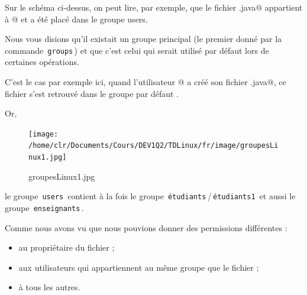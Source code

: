 \documentclass[11pt,a4paper]{article}
\begin{document}
          Sur le sch\'ema ci-dessus, on peut lire, par exemple, que le fichier \verb@Max.java@ 
          appartient \`a @ et a \'et\'e plac\'e dans le groupe users.
        
            \par
        
          Nous vous disions qu'il existait un groupe principal (le premier donn\'e par la commande \,\verb|groups|\,)
          et que c'est celui qui serait utilis\'e par d\'efaut lors de certaines op\'erations.
        
            \par
        
          C'est le cas par exemple ici,
          quand l'utilisateur @ a cr\'e\'e son fichier \verb@Max.java@,
          ce fichier s'est retrouv\'e dans le groupe par d\'efaut \verb@users@.
        
            \par
        
          Or, 
        
            \par
        \begin{figure}[hbt]
				    \begin{center}
					\texttt{[image: /home/clr/Documents/Cours/DEV1Q2/TDLinux/fr/image/groupesLinux1.jpg]}
						\end{center}
                
                    \caption[groupesLinux1.jpg]{groupesLinux1.jpg}
                \end{figure}
                    
            \par
        
          le groupe \,\verb|users|\, contient \`a la fois 
          le groupe \,\verb|étudiants|\,/\,\verb|étudiants1|\, et
          aussi le groupe \,\verb|enseignants|\,.
        
            \par
        
					Comme nous avons vu que nous pouvions donner des permissions diff\'erentes :
					
					\begin{itemize}
				
			\item au propri\'etaire du fichier ;
			\item aux utilisateurs qui appartiennent au m\^eme groupe que le fichier ;
			\item  \`a tous les autres. 
					\end{itemize}
				
\end{document}
